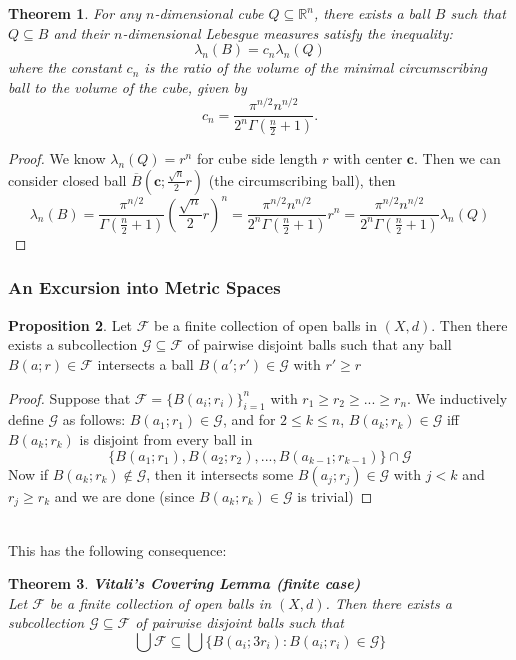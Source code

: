 \documentclass{article}
\theoremstyle{plain}
\newtheorem{thm}{Theorem}[section]
\theoremstyle{definition}
\newtheorem{prop}[thm]{Proposition}
\theoremstyle{remark}
\begin{document}
\begin{thm} \label{thm:circumscribing_ball}
    For any $n$-dimensional cube $Q \subseteq \mathbb{R}^n$, there exists a ball $B$ such that $Q \subseteq B$ and their $n$-dimensional Lebesgue measures satisfy the inequality:
$$
\lambda_n(B) = c_n \lambda_n(Q)
$$
where the constant $c_n$ is the ratio of the volume of the minimal circumscribing ball to the volume of the cube, given by
$$
c_n = \frac{\pi^{n/2} n^{n/2}}{2^n \Gamma\left(\frac{n}{2}+1\right)}.
$$
\end{thm}


\begin{proof}
    We know $\lambda_n(Q) = r^n$ for cube side length $r$ with center $\mathbf{c}$. Then we can consider closed ball $\overline{B} \left(\mathbf{c}; \frac{\sqrt{n}}{2}r \right)$ (the circumscribing ball), then  \[\lambda_n(B) = \frac{\pi^{n/2}}{\Gamma(\frac{n}{2}+1)}\left(\frac{\sqrt{n}}{2}r\right)^n =\frac{\pi ^{n/2} n^{n/2}}{2^n \Gamma (\frac{n}{2}+1)}r^n = \frac{\pi ^{n/2} n^{n/2}}{2^n \Gamma (\frac{n}{2}+1)} \lambda_n(Q)\]
\end{proof}

\subsubsection*{An Excursion into Metric Spaces}

\begin{prop}
    Let $\mathcal{F}$ be a finite collection of open balls in $(X,d)$. Then there exists a subcollection $\mathcal{G} \subseteq \mathcal{F}$ of pairwise disjoint balls such that any ball $B(a;r) \in \mathcal{F}$ intersects a ball $B(a'; r') \in \mathcal{G}$ with $r' \ge r$
\end{prop}
\begin{proof}
    Suppose that $\mathcal{F} = \{B(a_i; r_i)\}_{i=1}^n$ with $r_1 \ge r_2 \ge ... \ge r_n$. We inductively define $\mathcal{G}$ as follows:
    $B(a_1; r_1) \in \mathcal{G}$, and for $2 \le k \le n$, $B(a_k;r_k) \in \mathcal{G} $ iff $B(a_k; r_k)$ is disjoint from every ball in \[
    \{B(a_1; r_1), B(a_2; r_2), ..., B(a_{k-1}; r_{k-1})\} \cap \mathcal{G}
    \]
    Now if $B(a_k;r_k) \notin \mathcal{G}$, then it intersects some $B(a_j;r_j) \in \mathcal{G}$ with $j < k$ and $r_j \ge r_k$ and we are done (since $B(a_k;r_k) \in \mathcal{G}$ is trivial)
\end{proof}
~\\ This has the following consequence:

\begin{thm}{\textbf{Vitali's Covering Lemma (finite case)}} ~\\
    Let $\mathcal{F}$ be a finite collection of open balls in $(X,d)$. Then there exists a subcollection $\mathcal{G} \subseteq \mathcal{F}$ of pairwise disjoint balls such that
    \[
    \bigcup \mathcal{F} \subseteq \bigcup \{B(a_i; 3r_i):B(a_i; r_i) \in \mathcal{G}\}
    \]
\end{thm}
\end{document}
